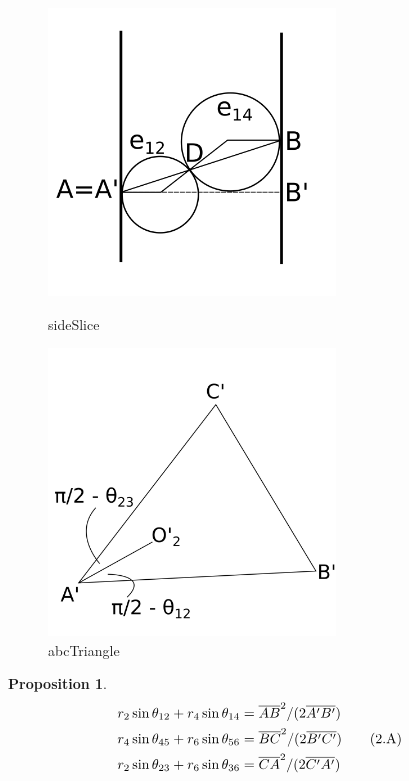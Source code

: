 \documentclass[suppldata, dvipdfmx]{interact}
\theoremstyle{plain}%
\newtheorem{proposition}[theorem]{Proposition}
\theoremstyle{definition}
\theoremstyle{remark}
\theoremstyle{problemstyle}
\begin{document}
\begin{figure}[h!tbp]
 \begin{minipage}[t]{0.5\textwidth}
 \centering
 \includegraphics[width=3in, height=3in,
 keepaspectratio]{./img/HexahedraWithSphericalFaces/sideSlice.png}
 \caption{sideSlice}
 \label{fig:sideSlice}
 \end{minipage}
 \hspace*{\fill}
 \begin{minipage}[t]{0.5\textwidth}
  \centering
  \includegraphics[width=3in, height=3in,
  keepaspectratio]{./img/HexahedraWithSphericalFaces/abcTriangle.png}
  \caption{abcTriangle}
  \label{fig:sideSlice}
 \end{minipage}
 \hspace*{\fill}
\end{figure}

\begin{proposition}\label{angles}
 \begin{align}
 r_2\sin\theta_{12} + r_4\sin\theta_{14} &= \overline{AB}^2 / (2\overline{A'B'})\notag\\
 r_4\sin\theta_{45} + r_6\sin\theta_{56} &= \overline{BC}^2 / (2\overline{B'C'})\tag{2.A}\label{2A}\\
 r_2\sin\theta_{23} + r_6\sin\theta_{36} &= \overline{CA}^2 / (2\overline{C'A'})\notag
 \end{align}
\end{proposition}
\end{document}
